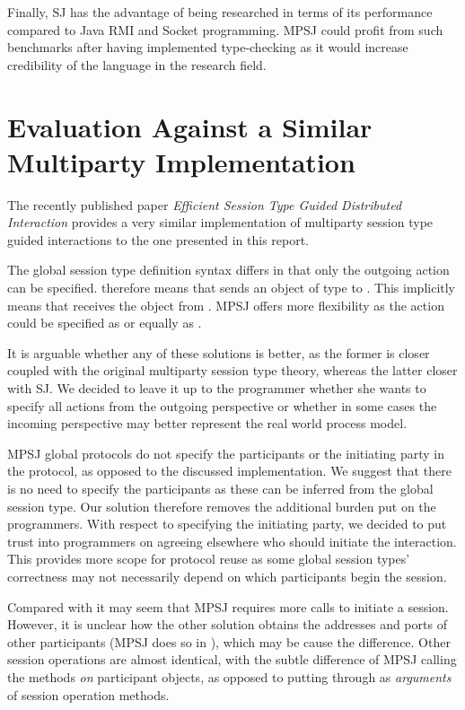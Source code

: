 Finally, SJ has the advantage of being researched in terms of its performance compared to Java RMI and Socket programming. MPSJ could profit from such benchmarks after having implemented type-checking as it would increase credibility of the language in the research field.

\section{Evaluation Against a Similar Multiparty Implementation}

The recently published paper \textit{Efficient Session Type Guided Distributed Interaction} provides a very similar implementation of multiparty session type guided interactions to the one presented in this report. 

The global session type definition syntax differs in that only the outgoing action can be specified.  therefore means that  sends an object of type  to . This implicitly means that  receives the object from . MPSJ offers more flexibility as the action could be specified as  or equally as . 

It is arguable whether any of these solutions is better, as the former is closer coupled with the original multiparty session type theory, whereas the latter closer with SJ. We decided to leave it up to the programmer whether she wants to specify all actions from the outgoing perspective or whether in some cases the incoming perspective may better represent the real world process model.

MPSJ global protocols do not specify the participants or the initiating party in the protocol, as opposed to the discussed implementation. We suggest that there is no need to specify the participants as these can be inferred from the global session type. Our solution therefore removes the additional burden put on the programmers. With respect to specifying the initiating party, we decided to put trust into programmers on agreeing elsewhere who should initiate the interaction. This provides more scope for protocol reuse as some global session types' correctness may not necessarily depend on which participants begin the session.

Compared with \cite{sess_type_guided_distr_interact} it may seem that MPSJ requires more calls to initiate a session. However, it is unclear how the other solution obtains the addresses and ports of other participants (MPSJ does so in ), which may be cause the difference. Other session operations are almost identical, with the subtle difference of MPSJ calling the methods \textit{on} participant objects, as opposed to putting through as \textit{arguments} of session operation methods.

